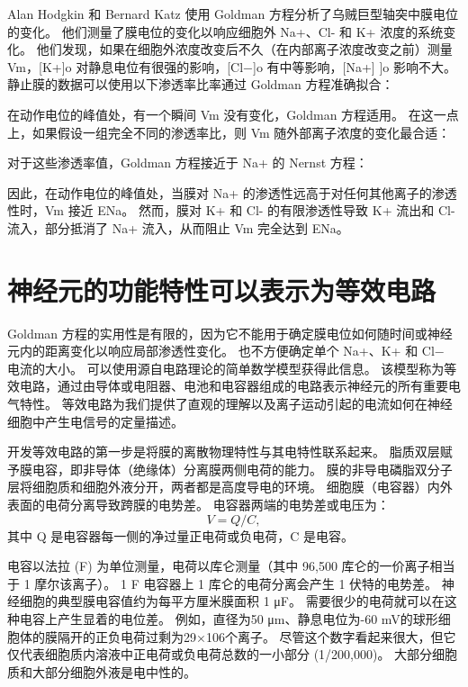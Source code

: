 Alan Hodgkin 和 Bernard Katz 使用 Goldman 方程分析了乌贼巨型轴突中膜电位的变化。 
他们测量了膜电位的变化以响应细胞外 Na+、Cl- 和 K+ 浓度的系统变化。 
他们发现，如果在细胞外浓度改变后不久（在内部离子浓度改变之前）测量 Vm，[K+]o 对静息电位有很强的影响，[Cl−]o 有中等影响，[Na+] ]o 影响不大。 
静止膜的数据可以使用以下渗透率比率通过 Goldman 方程准确拟合：


在动作电位的峰值处，有一个瞬间 Vm 没有变化，Goldman 方程适用。 
在这一点上，如果假设一组完全不同的渗透率比，则 Vm 随外部离子浓度的变化最合适：


对于这些渗透率值，Goldman 方程接近于 Na+ 的 Nernst 方程：


因此，在动作电位的峰值处，当膜对 Na+ 的渗透性远高于对任何其他离子的渗透性时，Vm 接近 ENa。 
然而，膜对 K+ 和 Cl- 的有限渗透性导致 K+ 流出和 Cl- 流入，部分抵消了 Na+ 流入，从而阻止 Vm 完全达到 ENa。



\section{神经元的功能特性可以表示为等效电路}
Goldman 方程的实用性是有限的，因为它不能用于确定膜电位如何随时间或神经元内的距离变化以响应局部渗透性变化。 
也不方便确定单个 Na+、K+ 和 Cl− 电流的大小。 
可以使用源自电路理论的简单数学模型获得此信息。 
该模型称为等效电路，通过由导体或电阻器、电池和电容器组成的电路表示神经元的所有重要电气特性。 
等效电路为我们提供了直观的理解以及离子运动引起的电流如何在神经细胞中产生电信号的定量描述。


开发等效电路的第一步是将膜的离散物理特性与其电特性联系起来。 
脂质双层赋予膜电容，即非导体（绝缘体）分离膜两侧电荷的能力。 
膜的非导电磷脂双分子层将细胞质和细胞外液分开，两者都是高度导电的环境。 
细胞膜（电容器）内外表面的电荷分离导致跨膜的电势差。 
电容器两端的电势差或电压为：
\begin{equation}
	V = Q/C,
\end{equation}
其中 Q 是电容器每一侧的净过量正电荷或负电荷，C 是电容。


电容以法拉 (F) 为单位测量，电荷以库仑测量（其中 96,500 库仑的一价离子相当于 1 摩尔该离子）。 
1 F 电容器上 1 库仑的电荷分离会产生 1 伏特的电势差。 
神经细胞的典型膜电容值约为每平方厘米膜面积 1 μF。 
需要很少的电荷就可以在这种电容上产生显着的电位差。 
例如，直径为50 μm、静息电位为-60 mV的球形细胞体的膜隔开的正负电荷过剩为29×106个离子。 
尽管这个数字看起来很大，但它仅代表细胞质内溶液中正电荷或负电荷总数的一小部分 (1/200,000)。 
大部分细胞质和大部分细胞外液是电中性的。


